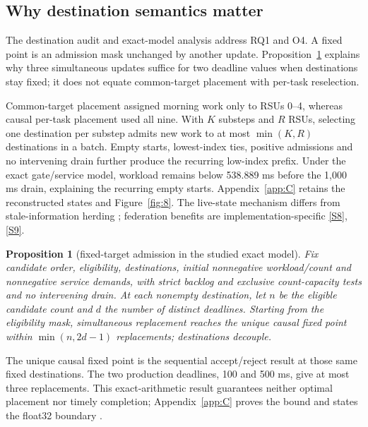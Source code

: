 \documentclass[12pt,a4paper]{article}
\newtheorem{proposition}{Proposition}
\begin{document}
\FloatBarrier
\subsection{Why destination semantics matter}\label{sec:3.5}

The destination audit and exact-model analysis address RQ1 and O4. A fixed point is an admission mask unchanged by another update. Proposition~\ref{prop:1} explains why three simultaneous updates suffice for two deadline values when destinations stay fixed; it does not equate common-target placement with per-task reselection.

Common-target placement assigned morning work only to RSUs 0--4, whereas causal per-task placement used all nine. With $K$ substeps and $R$ RSUs, selecting one destination per substep admits new work to at most $\min(K,R)$ destinations in a batch. Empty starts, lowest-index ties, positive admissions and no intervening drain further produce the recurring low-index prefix. Under the exact gate/service model, workload remains below 538.889 ms before the 1,000 ms drain, explaining the recurring empty starts. Appendix~\ref{app:C} retains the reconstructed states and Figure~\ref{fig:8}. The live-state mechanism differs from stale-information herding \cite{ref45}; federation benefits are implementation-specific \cite{ref46} \hyperref[source-s8]{[S8]}, \hyperref[source-s9]{[S9]}.

\begin{proposition}[fixed-target admission in the studied exact model]\label{prop:1}
Fix candidate order, eligibility, destinations, initial nonnegative workload/count and nonnegative service demands, with strict backlog and exclusive count-capacity tests and no intervening drain. At each nonempty destination, let $n$ be the eligible candidate count and $d$ the number of distinct deadlines. Starting from the eligibility mask, simultaneous replacement reaches the unique causal fixed point within $\min(n,2d-1)$ replacements; destinations decouple.\end{proposition}

The unique causal fixed point is the sequential accept/reject result at those same fixed destinations. The two production deadlines, 100 and 500 ms, give at most three replacements. This exact-arithmetic result guarantees neither optimal placement nor timely completion; Appendix~\ref{app:C} proves the bound and states the float32 boundary \cite{ref41}.
\end{document}
